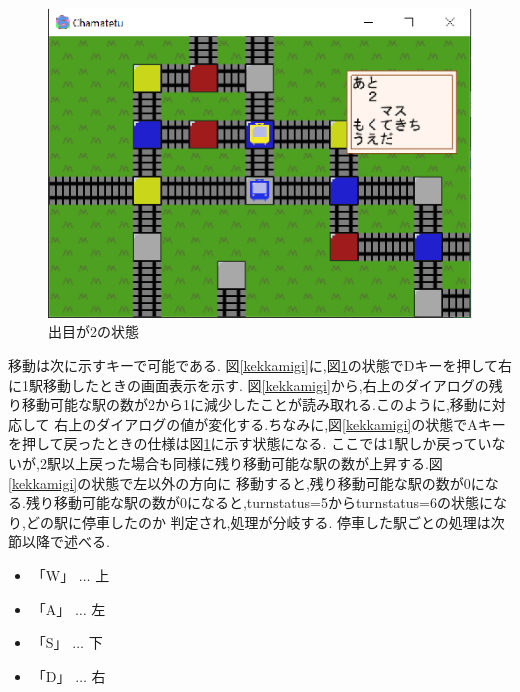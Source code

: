 \documentclass[a4j]{jarticle}
\begin{document}
    \begin{figure}[H]
        \centering
        \includegraphics[scale=1.3]{kekka2.eps}
        \caption{出目が2の状態}
         \label{kekka2}
        \end{figure} 

    移動は次に示すキーで可能である. 図\ref{kekkamigi}に,図\ref{kekka2}の状態でDキーを押して右に1駅移動したときの画面表示を示す.
    図\ref{kekkamigi}から,右上のダイアログの残り移動可能な駅の数が2から1に減少したことが読み取れる.このように,移動に対応して
    右上のダイアログの値が変化する.ちなみに,図\ref{kekkamigi}の状態でAキーを押して戻ったときの仕様は図\ref{kekka2}に示す状態になる.
    ここでは1駅しか戻っていないが,2駅以上戻った場合も同様に残り移動可能な駅の数が上昇する.図\ref{kekkamigi}の状態で左以外の方向に
    移動すると,残り移動可能な駅の数が0になる.残り移動可能な駅の数が0になると,turnstatus=5からturnstatus=6の状態になり,どの駅に停車したのか
    判定され,処理が分岐する. 停車した駅ごとの処理は次節以降で述べる.

    \begin{itemize}
        \item 「W」 $\dots$ 上
        \item 「A」 $\dots$ 左
        \item 「S」 $\dots$ 下
        \item 「D」 $\dots$ 右
    \end{itemize}
\end{document}
